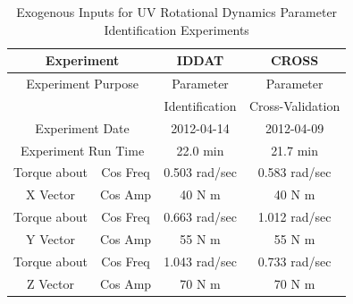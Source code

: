 \begin{table}[htbp]
\ssp
\caption{Exogenous Inputs for \ac{UV} Rotational Dynamics Parameter
  Identification Experiments}  
\begin{center}
\begin{tabular}{cccc}
\multicolumn{2}{c}{Experiment} & \ac{IDDAT} & \ac{CROSS} \\
\hline
\multicolumn{2}{c}{Experiment Purpose}  & Parameter      & Parameter  \\
               &                        & Identification & Cross-Validation \\
\hline
\multicolumn{2}{c}{Experiment Date}     & 2012-04-14    &   2012-04-09  \\ 
\hline
\multicolumn{2}{c}{Experiment Run Time} &  22.0 min     &   21.7 min    \\ 
\hline
Torque about &          Cos Freq          & 0.503 rad/sec & 0.583 rad/sec \\ 
X Vector     &          Cos Amp           &     40 N m    &     40 N m    \\ 
\hline
Torque about &          Cos Freq          & 0.663 rad/sec & 1.012 rad/sec \\ 
Y Vector     &          Cos Amp           &     55 N m    &     55 N m    \\ 
\hline
Torque about &          Cos Freq          & 1.043 rad/sec & 0.733 rad/sec \\ 
Z Vector     &          Cos Amp           &     70 N m    &     70 N m    \\ 
\hline \end{tabular}
\end{center}
\label{chUV_AID.tb.UVSO3expStat}
\end{table}



